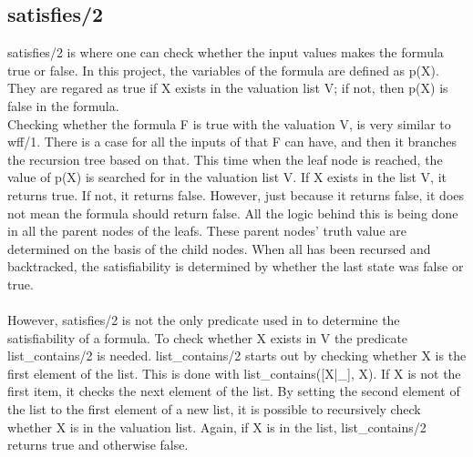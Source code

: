 \documentclass[a4paper,10pt]{article}
\begin{document}
\subsection{satisfies/2}
\textsf{satisfies/2} is where one can check whether the input values makes the formula true or false. In this project, the variables of the formula are defined as \textsf{p(X)}. They are regared as true if X exists in the valuation list V; if not, then \textsf{p(X)} is false in the formula.\\
Checking whether the formula F is true with the valuation V, is very similar to \textsf{wff/1}. There is a case for all the inputs of that F can have, and then it branches the recursion tree based on that. This time when the leaf node is reached, the value of \textsf{p(X)} is searched for in the valuation list V. If X exists in the list V, it returns true. If not, it returns false. However, just because it returns false, it does not mean the formula should return false. All the logic behind this is being done in all the parent nodes of the leafs. These parent nodes' truth value are determined on the basis of the child nodes. When all has been recursed and backtracked, the satisfiability is determined by whether the last state was false or true.\\\\
However, \textsf{satisfies/2} is not the only predicate used in to determine the satisfiability of a formula. To check whether X exists in V the predicate \textsf{list\_contains/2} is needed. \textsf{list\_contains/2} starts out by checking whether X is the first element of the list. This is done with \textsf{list\_contains([X|\_], X).} If X is not the first item, it checks the next element of the list. By setting the second element of the list to the first element of a new list, it is possible to recursively check whether X is in the valuation list. Again, if X is in the list, \textsf{list\_contains/2} returns true and otherwise false.
\end{document}
